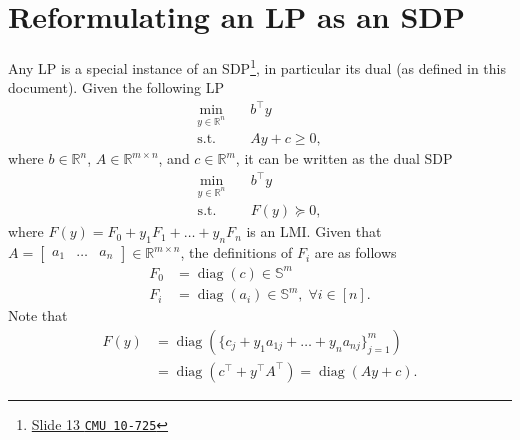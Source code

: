 \documentclass[a4paper]{article}
\DeclareMathOperator{\diag}{diag}
\begin{document}
\section*{Reformulating an LP as an SDP}
Any LP is a special instance of an SDP\footnote{\href{http://www.stat.cmu.edu/~ryantibs/convexopt-F13/lectures/18-semidefiniteprogramming.pdf}{Slide 13 \texttt{CMU 10-725}}}, in particular its dual (as defined in this document).
Given the following LP
\begin{equation}\label{eq:general-lp}
\begin{split}
\min_{y\in\mathbb{R}^n}  \quad & b^\top y\\
\textrm{s.t. } \quad & Ay + c \ge 0,
\end{split}
\end{equation}
where $b\in\mathbb{R}^n$, $A\in\mathbb{R}^{m\times n}$, and $c\in\mathbb{R}^m$, it can be written as the dual SDP
\begin{equation}\label{eq:general-lp-sdp}
\begin{split}
\min_{y\in\mathbb{R}^n}  \quad & b^\top y\\
\textrm{s.t. } \quad & F(y) \succeq 0,
\end{split}
\end{equation}
where $F(y) = F_0 + y_1F_1 + \dots + y_nF_n$ is an LMI.
Given that $A = \begin{bmatrix}a_1 & \dots & a_n\end{bmatrix}\in\mathbb{R}^{m\times n}$, the definitions of $F_i$ are as follows
\begin{align*}
F_0 &= \diag(c) \in\mathbb{S}^m \\
F_i &= \diag(a_i) \in\mathbb{S}^m,\;\forall i\in[n].
\end{align*}
Note that
\begin{align}
F(y) &= \diag(\{c_j + y_1 a_{1j} + \dots + y_n a_{nj}\}^m_{j=1}) \\
     &= \diag(c^\top + y^\top A^\top) = \diag(Ay + c).
\end{align}
\end{document}

